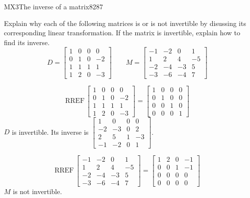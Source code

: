 \begin{exercise}{MX3}{The inverse of a matrix}{8287} 
\begin{exerciseStatement} 

 Explain why each of the following matrices is or is not invertible by disussing its corresponding linear transformation. If the matrix is invertible, explain how to find its inverse. \[
\hspace{2em}
D = \left[\begin{array}{cccc}
1 & 0 & 0 & 0 \\
0 & 1 & 0 & -2 \\
1 & 1 & 1 & 1 \\
1 & 2 & 0 & -3
\end{array}\right]
\hspace{2em}
M = \left[\begin{array}{cccc}
-1 & -2 & 0 & 1 \\
1 & 2 & 4 & -5 \\
-2 & -4 & -3 & 5 \\
-3 & -6 & -4 & 7
\end{array}\right]
\hspace{2em}
        \] 

 \end{exerciseStatement}
 \begin{exerciseAnswer} 

 \[\mathrm{RREF}\,\left[\begin{array}{cccc}
1 & 0 & 0 & 0 \\
0 & 1 & 0 & -2 \\
1 & 1 & 1 & 1 \\
1 & 2 & 0 & -3
\end{array}\right]=\left[\begin{array}{cccc}
1 & 0 & 0 & 0 \\
0 & 1 & 0 & 0 \\
0 & 0 & 1 & 0 \\
0 & 0 & 0 & 1
\end{array}\right]\] \(D\) is invertible. Its inverse is \(\left[\begin{array}{cccc}
1 & 0 & 0 & 0 \\
-2 & -3 & 0 & 2 \\
2 & 5 & 1 & -3 \\
-1 & -2 & 0 & 1
\end{array}\right]\). 

 

 \[\mathrm{RREF}\,\left[\begin{array}{cccc}
-1 & -2 & 0 & 1 \\
1 & 2 & 4 & -5 \\
-2 & -4 & -3 & 5 \\
-3 & -6 & -4 & 7
\end{array}\right]=\left[\begin{array}{cccc}
1 & 2 & 0 & -1 \\
0 & 0 & 1 & -1 \\
0 & 0 & 0 & 0 \\
0 & 0 & 0 & 0
\end{array}\right]\] \(M\) is not invertible. 

 \end{exerciseAnswer}
 \end{exercise}

